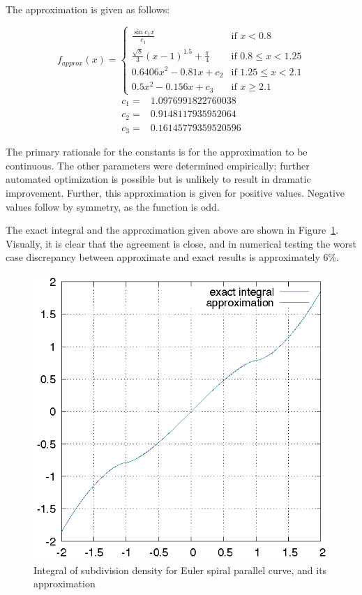 \documentclass[format=acmsmall]{acmart}
\begin{document}
The approximation is given as follows:

\[ 
    f_\mathit{approx}(x) = \left\{
        \begin{array}{rl}
            \frac{\sin c_1 x}{c_1} & \text{if } x < 0.8 \\
            \frac{\sqrt{8}}{3}(x-1)^{1.5} + \frac{\pi}{4} & \text{if } 0.8 \leq x < 1.25 \\
            0.6406x^2 - 0.81x + c_2 & \text{if } 1.25 \leq x < 2.1 \\
            0.5x^2 - 0.156x + c_3 & \text{if } x \geq 2.1
        \end{array}
        \right.
\]
\[
    \begin{array}{ll}
        c_1 = & 1.0976991822760038 \\
        c_2 = & 0.9148117935952064 \\
        c_3 = & 0.16145779359520596
    \end{array}
\]

The primary rationale for the constants is for the approximation to be continuous. The other parameters were determined empirically; further automated optimization is possible but is unlikely to result in dramatic improvement. Further, this approximation is given for positive values. Negative values follow by symmetry, as the function is odd.

The exact integral and the approximation given above are shown in Figure~\ref{fig:espc}. Visually, it is clear that the agreement is close, and in numerical testing the worst case discrepancy between approximate and exact results is approximately 6\%.

\begin{figure}
    \includegraphics{espc}
    \caption{Integral of subdivision density for Euler spiral parallel curve, and its approximation}
    \label{fig:espc}
\end{figure}
\end{document}
